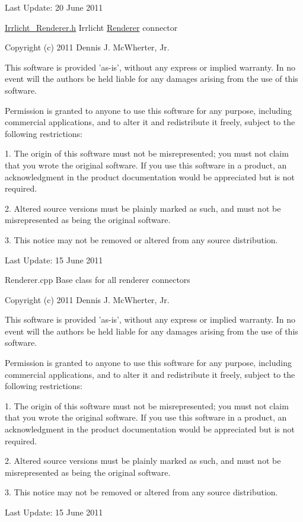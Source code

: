 Last Update: 20 June 2011

\hyperlink{_irrlicht___renderer_8h_source}{Irrlicht\_\-Renderer.h} Irrlicht \hyperlink{class_micro_f_p_s_1_1_renderer}{Renderer} connector

Copyright (c) 2011 Dennis J. McWherter, Jr.

This software is provided 'as-\/is', without any express or implied warranty. In no event will the authors be held liable for any damages arising from the use of this software.

Permission is granted to anyone to use this software for any purpose, including commercial applications, and to alter it and redistribute it freely, subject to the following restrictions:

1. The origin of this software must not be misrepresented; you must not claim that you wrote the original software. If you use this software in a product, an acknowledgment in the product documentation would be appreciated but is not required.

2. Altered source versions must be plainly marked as such, and must not be misrepresented as being the original software.

3. This notice may not be removed or altered from any source distribution.

Last Update: 15 June 2011

Renderer.cpp Base class for all renderer connectors

Copyright (c) 2011 Dennis J. McWherter, Jr.

This software is provided 'as-\/is', without any express or implied warranty. In no event will the authors be held liable for any damages arising from the use of this software.

Permission is granted to anyone to use this software for any purpose, including commercial applications, and to alter it and redistribute it freely, subject to the following restrictions:

1. The origin of this software must not be misrepresented; you must not claim that you wrote the original software. If you use this software in a product, an acknowledgment in the product documentation would be appreciated but is not required.

2. Altered source versions must be plainly marked as such, and must not be misrepresented as being the original software.

3. This notice may not be removed or altered from any source distribution.

Last Update: 15 June 2011

